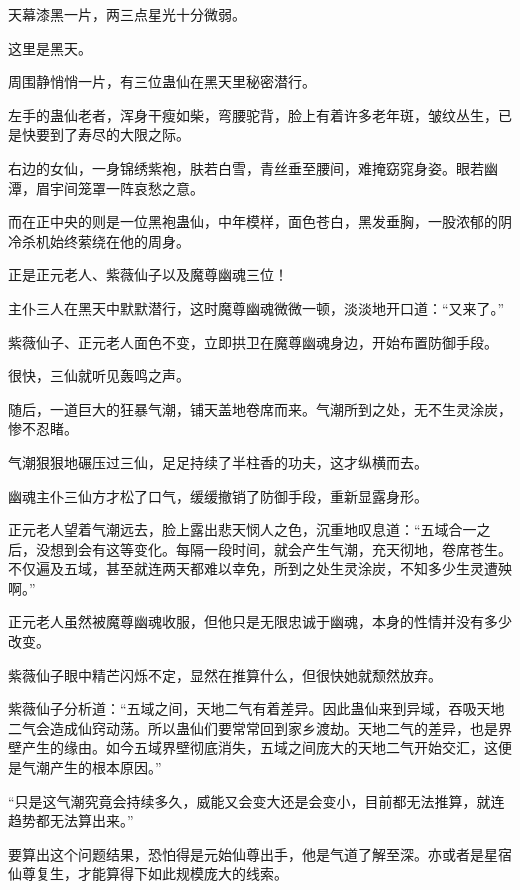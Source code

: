 
\begin{this_body}



天幕漆黑一片，两三点星光十分微弱。

这里是黑天。

周围静悄悄一片，有三位蛊仙在黑天里秘密潜行。

左手的蛊仙老者，浑身干瘦如柴，弯腰驼背，脸上有着许多老年斑，皱纹丛生，已是快要到了寿尽的大限之际。

右边的女仙，一身锦绣紫袍，肤若白雪，青丝垂至腰间，难掩窈窕身姿。眼若幽潭，眉宇间笼罩一阵哀愁之意。

而在正中央的则是一位黑袍蛊仙，中年模样，面色苍白，黑发垂胸，一股浓郁的阴冷杀机始终萦绕在他的周身。

正是正元老人、紫薇仙子以及魔尊幽魂三位！

主仆三人在黑天中默默潜行，这时魔尊幽魂微微一顿，淡淡地开口道：“又来了。”

紫薇仙子、正元老人面色不变，立即拱卫在魔尊幽魂身边，开始布置防御手段。

很快，三仙就听见轰鸣之声。

随后，一道巨大的狂暴气潮，铺天盖地卷席而来。气潮所到之处，无不生灵涂炭，惨不忍睹。

气潮狠狠地碾压过三仙，足足持续了半柱香的功夫，这才纵横而去。

幽魂主仆三仙方才松了口气，缓缓撤销了防御手段，重新显露身形。

正元老人望着气潮远去，脸上露出悲天悯人之色，沉重地叹息道：“五域合一之后，没想到会有这等变化。每隔一段时间，就会产生气潮，充天彻地，卷席苍生。不仅遍及五域，甚至就连两天都难以幸免，所到之处生灵涂炭，不知多少生灵遭殃啊。”

正元老人虽然被魔尊幽魂收服，但他只是无限忠诚于幽魂，本身的性情并没有多少改变。

紫薇仙子眼中精芒闪烁不定，显然在推算什么，但很快她就颓然放弃。

紫薇仙子分析道：“五域之间，天地二气有着差异。因此蛊仙来到异域，吞吸天地二气会造成仙窍动荡。所以蛊仙们要常常回到家乡渡劫。天地二气的差异，也是界壁产生的缘由。如今五域界壁彻底消失，五域之间庞大的天地二气开始交汇，这便是气潮产生的根本原因。”

“只是这气潮究竟会持续多久，威能又会变大还是会变小，目前都无法推算，就连趋势都无法算出来。”

要算出这个问题结果，恐怕得是元始仙尊出手，他是气道了解至深。亦或者是星宿仙尊复生，才能算得下如此规模庞大的线索。


\end{this_body}
